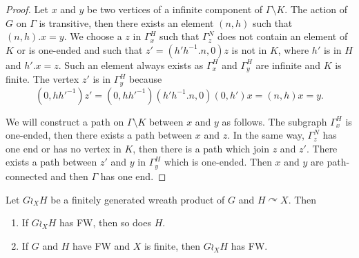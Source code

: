 \begin{proof}
Let $x$ and $y$ be two vertices of a infinite component of $\Gamma \setminus K$. The action of $G$ on $\Gamma$ is transitive, then there exists an element $(n,h)$ such that $(n,h).x = y$. We choose a $z$ in $\Gamma_x^H$ such that $\Gamma_z^N$ does not contain an element of $K$ or is one-ended and such that $z'=(h'h^{-1}.n,0)z$ is not in $K$, where $h'$ is in $H$ and $h'.x = z$. Such an element always exists as $\Gamma_x^H$ and $\Gamma_y^H$ are infinite and $K$ is finite. The vertex $z'$ is in $\Gamma_y^H$ because
\begin{equation*}
(0,hh'^{-1}) z' = (0,hh'^{-1})(h'h^{-1}.n,0)(0,h')x = (n,h)x = y.
\end{equation*}
%

We will construct a path on $\Gamma \setminus K$ between $x$ and $y$ as follows. The subgraph $\Gamma_x^H$ is one-ended, then there exists a path between $x$ and $z$. In the same way, $\Gamma_z^N$ has one end or has no vertex in $K$, then there is a path which join $z$ and $z'$. There exists a path between $z'$ and $y$ in $\Gamma_y^H$ which is one-ended. Then $x$ and $y$ are path-connected and then $\Gamma$ has one end. 
\end{proof}
%
%
\begin{cor}\label{Cor:Wreath_ends}
Let $G\wr_X H$ be a finitely generated wreath product of $G$ and $H\curvearrowright X$.
Then
\begin{enumerate}
\item
If $G\wr_X H$ has FW, then so does $H$.
\item
If $G$ and $H$ have FW and $X$ is finite, then $G\wr_X H$ has FW.
\end{enumerate}
\end{cor}
%
%
